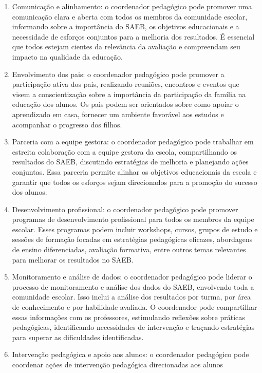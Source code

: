 \begin{enumerate}
\def\labelenumi{\arabic{enumi}.}
\item
  Comunicação e alinhamento: o coordenador pedagógico pode promover uma
  comunicação clara e aberta com todos os membros da comunidade escolar,
  informando sobre a importância do SAEB, os objetivos educacionais e a
  necessidade de esforços conjuntos para a melhoria dos resultados. É
  essencial que todos estejam cientes da relevância da avaliação e
  compreendam seu impacto na qualidade da educação.
\item
  Envolvimento dos pais: o coordenador pedagógico pode promover a
  participação ativa dos pais, realizando reuniões, encontros e eventos
  que visem a conscientização sobre a importância da participação da
  família na educação dos alunos. Os pais podem ser orientados sobre
  como apoiar o aprendizado em casa, fornecer um ambiente favorável aos
  estudos e acompanhar o progresso dos filhos.
\item
  Parceria com a equipe gestora: o coordenador pedagógico pode trabalhar
  em estreita colaboração com a equipe gestora da escola, compartilhando
  os resultados do SAEB, discutindo estratégias de melhoria e planejando
  ações conjuntas. Essa parceria permite alinhar os objetivos
  educacionais da escola e garantir que todos os esforços sejam
  direcionados para a promoção do sucesso dos alunos.
\item
  Desenvolvimento profissional: o coordenador pedagógico pode promover
  programas de desenvolvimento profissional para todos os membros da
  equipe escolar. Esses programas podem incluir workshops, cursos,
  grupos de estudo e sessões de formação focadas em estratégias
  pedagógicas eficazes, abordagens de ensino diferenciadas, avaliação
  formativa, entre outros temas relevantes para melhorar os resultados
  no SAEB.
\item
  Monitoramento e análise de dados: o coordenador pedagógico pode
  liderar o processo de monitoramento e análise dos dados do SAEB,
  envolvendo toda a comunidade escolar. Isso inclui a análise dos
  resultados por turma, por área de conhecimento e por habilidade
  avaliada. O coordenador pode compartilhar essas informações com os
  professores, estimulando reflexões sobre práticas pedagógicas,
  identificando necessidades de intervenção e traçando estratégias para
  superar as dificuldades identificadas.
\item
  Intervenção pedagógica e apoio aos alunos: o coordenador pedagógico
  pode coordenar ações de intervenção pedagógica direcionadas aos alunos

\end{enumerate}
